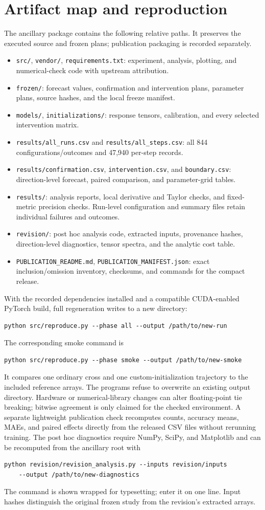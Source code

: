 \documentclass[11pt]{article}
\begin{document}
\section{Artifact map and reproduction}\label{app:artifacts}
The ancillary package contains the following relative paths. It preserves the executed source and frozen plans; publication packaging is recorded separately.
\begin{itemize}
\item \texttt{src/}, \texttt{vendor/}, \texttt{requirements.txt}: experiment, analysis, plotting, and numerical-check code with upstream attribution.
\item \texttt{frozen/}: forecast values, confirmation and intervention plans, parameter plans, source hashes, and the local freeze manifest.
\item \texttt{models/}, \texttt{initializations/}: response tensors, calibration, and every selected intervention matrix.
\item \texttt{results/all\_runs.csv} and \texttt{results/all\_steps.csv}: all 844 configurations/outcomes and 47,940 per-step records.
\item \texttt{results/confirmation.csv}, \texttt{intervention.csv}, and \texttt{boundary.csv}: direction-level forecast, paired comparison, and parameter-grid tables.
\item \texttt{results/}: analysis reports, local derivative and Taylor checks, and fixed-metric precision checks. Run-level configuration and summary files retain individual failures and outcomes.
\item \texttt{revision/}: post hoc analysis code, extracted inputs, provenance hashes, direction-level diagnostics, tensor spectra, and the analytic cost table.
\item \texttt{PUBLICATION\_README.md}, \texttt{PUBLICATION\_MANIFEST.json}: exact inclusion/omission inventory, checksums, and commands for the compact release.
\end{itemize}
With the recorded dependencies installed and a compatible CUDA-enabled PyTorch build, full regeneration writes to a new directory:
\begin{verbatim}
python src/reproduce.py --phase all --output /path/to/new-run
\end{verbatim}
The corresponding smoke command is
\begin{verbatim}
python src/reproduce.py --phase smoke --output /path/to/new-smoke
\end{verbatim}
It compares one ordinary cross and one custom-initialization trajectory to the included reference arrays. The programs refuse to overwrite an existing output directory. Hardware or numerical-library changes can alter floating-point tie breaking; bitwise agreement is only claimed for the checked environment. A separate lightweight publication check recomputes counts, accuracy means, MAEs, and paired effects directly from the released CSV files without rerunning training. The post hoc diagnostics require NumPy, SciPy, and Matplotlib and can be recomputed from the ancillary root with
\begin{verbatim}
python revision/revision_analysis.py --inputs revision/inputs 
    --output /path/to/new-diagnostics
\end{verbatim}
The command is shown wrapped for typesetting; enter it on one line. Input hashes distinguish the original frozen study from the revision's extracted arrays.
\end{document}
